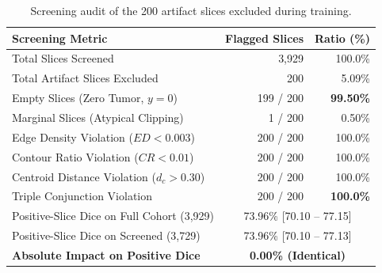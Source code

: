 \documentclass[11pt,a4paper]{article}
\begin{document}
\begin{table}[tbp]
\centering
\caption{Screening audit of the 200 artifact slices excluded during training.}
\label{tab:screening_audit}
\setlength{\tabcolsep}{8pt}
\small
\begin{tabular*}{\textwidth}{@{\extracolsep{\fill}}lrr}
\toprule
\textbf{Screening Metric} & \textbf{Flagged Slices} & \textbf{Ratio (\%)} \\
\midrule
Total Slices Screened & 3,929 & 100.0\% \\
Total Artifact Slices Excluded & 200 & 5.09\% \\
\midrule
\hspace{1.2em}Empty Slices (Zero Tumor, $y=0$) & 199 / 200 & \textbf{99.50\%} \\
\hspace{1.2em}Marginal Slices (Atypical Clipping) & 1 / 200 & 0.50\% \\
\hspace{1.2em}Edge Density Violation ($ED < 0.003$) & 200 / 200 & 100.0\% \\
\hspace{1.2em}Contour Ratio Violation ($CR < 0.01$) & 200 / 200 & 100.0\% \\
\hspace{1.2em}Centroid Distance Violation ($d_c > 0.30$) & 200 / 200 & 100.0\% \\
\hspace{1.2em}Triple Conjunction Violation & 200 / 200 & \textbf{100.0\%} \\
\midrule
Positive-Slice Dice on Full Cohort (3,929) & \multicolumn{2}{c}{73.96\% [70.10 -- 77.15]} \\
Positive-Slice Dice on Screened (3,729) & \multicolumn{2}{c}{73.96\% [70.10 -- 77.13]} \\
\textbf{Absolute Impact on Positive Dice} & \multicolumn{2}{c}{\textbf{0.00\% (Identical)}} \\
\bottomrule
\end{tabular*}
\end{table}
\end{document}
